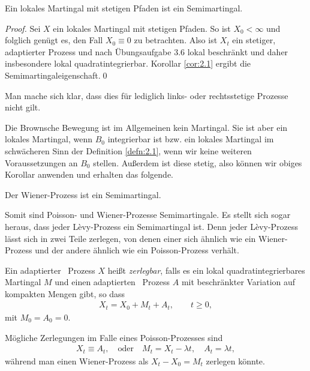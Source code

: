 \begin{korollar}
\label{cor:2.2}
Ein lokales Martingal mit stetigen Pfaden ist ein Semimartingal.\fish
\end{korollar}
\begin{proof}
Sei $X$ ein lokales Martingal mit stetigen Pfaden. So ist $X_0 < \infty$ \fs und
folglich genügt es, den Fall $X_0\equiv 0$ zu betrachten. Also ist $X_t$ ein
stetiger, adaptierter Prozess und nach Übungsaufgabe 3.6 lokal beschränkt und
daher insbesondere lokal quadratintegrierbar. Korollar \ref{cor:2.1} ergibt die 
Semimartingaleigenschaft.\qed
\end{proof}

Man mache sich klar, dass dies für lediglich links- oder rechtsstetige Prozesse
nicht gilt. 

Die Brownsche Bewegung ist im Allgemeinen kein Martingal. Sie ist aber ein
lokales Martingal, wenn $B_0$ integrierbar ist bzw. ein lokales Martingal im
schwächeren Sinn der Definition \ref{defn:2.1}, wenn wir keine
weiteren Voraussetzungen an $B_0$ stellen. Außerdem ist diese stetig, also
können wir obiges Korollar anwenden und erhalten das folgende.

\begin{korollar}
\label{cor:2.3}
Der Wiener-Prozess ist ein Semimartingal.\fish
\end{korollar}

Somit sind Poisson- und Wiener-Prozesse Semimartingale. Es stellt sich sogar
heraus, dass jeder Lèvy-Prozess ein Semimartingal ist. Denn jeder Lèvy-Prozess
lässt sich in zwei Teile zerlegen, von denen einer sich ähnlich wie ein
Wiener-Prozess und der andere ähnlich wie ein Poisson-Prozess verhält.

\begin{definition}
\label{defn:2.4}
 Ein adaptierter \cadlag\ Prozess $X$ heißt \emph{zerlegbar}, falls
 es ein lokal quadrat\-integrierbares Martingal $M$ und einen adaptierten
 \cadlag\ Prozess $A$ mit beschränkter Variation auf kompakten Mengen gibt,
  so dass
  \begin{align*}
X_t = X_0 + M_t + A_t,\qquad t\ge 0, 
\end{align*}
mit $M_0=A_0=0$.\fish
\end{definition}

Mögliche Zerlegungen im Falle eines Poisson-Prozesses sind
\begin{align*}
X_t \equiv A_t,\quad \text{oder}\quad M_t = X_t - \lambda t,\quad A_t = \lambda
t,
\end{align*}
während man einen Wiener-Prozess als $X_t - X_0 = M_t$ zerlegen könnte.

